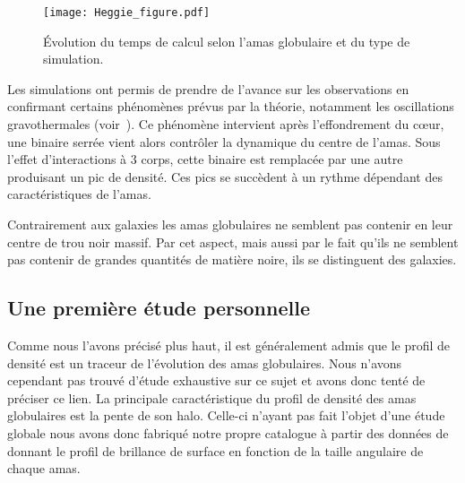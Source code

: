 			\begin{figure}[h]
				\centering \texttt{[image: Heggie\_figure.pdf]}
				\caption{\label{Fig::Intro::HeggieFigure}Évolution du temps de
				calcul selon l'amas globulaire et du type de simulation.}
			\end{figure}

			Les simulations ont permis de prendre de l'avance sur les observations en
			confirmant certains phénomènes prévus par la théorie, notamment
			les oscillations gravothermales (voir~\cite{1996ApJ...471..796M}). Ce phénomène
			intervient après l'effondrement du cœur, une binaire serrée vient alors
			contrôler la dynamique du centre de l'amas. Sous l'effet d'interactions à 3
			corps, cette binaire est remplacée par une autre produisant un pic de
			densité. Ces pics se succèdent à un rythme dépendant des caractéristiques de
			l'amas.

			Contrairement aux galaxies les amas globulaires ne semblent pas contenir
			en leur centre de trou noir massif. Par cet aspect, mais
			aussi par le fait qu'ils ne semblent pas contenir de grandes quantités de
			matière noire, ils se distinguent des galaxies.

		\subsection{Une première étude personnelle}

			Comme nous l'avons précisé plus haut, il est généralement admis que le
			profil de densité est un traceur de l'évolution des amas globulaires. Nous
			n'avons cependant pas trouvé d'étude exhaustive sur ce sujet et avons donc
			tenté de préciser ce lien.
			La principale caractéristique du profil de densité des amas globulaires est
			la pente de son halo. Celle-ci n'ayant pas fait l'objet d'une étude globale nous
			avons donc fabriqué notre propre catalogue à partir des données
			de~\cite{Trager-graphe} donnant le profil de brillance de surface en fonction de la taille angulaire
			de chaque amas.



				
